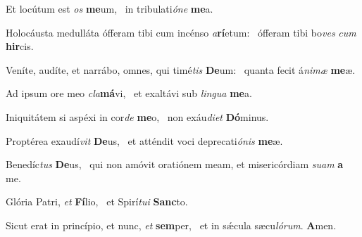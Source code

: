 \item Et locútum est \textit{os} \textbf{me}um,~\psstar{} in tribulati\textit{óne} \textbf{me}a.

\item Holocáusta medulláta ófferam tibi cum incénso \textit{a}\textbf{rí}etum:~\psstar{} ófferam tibi bo\textit{ves} \textit{cum} \textbf{hir}cis.

\item Veníte, audíte, et narrábo, omnes, qui timé\textit{tis} \textbf{De}um:~\psstar{} quanta fecit á\textit{nimæ} \textbf{me}æ.

\item Ad ipsum ore meo \textit{cla}\textbf{má}vi,~\psstar{} et exaltávi sub \textit{lingua} \textbf{me}a.

\item Iniquitátem si aspéxi in cor\textit{de} \textbf{me}o,~\psstar{} non exáu\textit{diet} \textbf{Dó}minus.

\item Proptérea exaudí\textit{vit} \textbf{De}us,~\psstar{} et atténdit voci deprecati\textit{ónis} \textbf{me}æ.

\item Benedíc\textit{tus} \textbf{De}us,~\psstar{} qui non amóvit oratiónem meam, et misericórdiam \textit{suam} \textbf{a} me.

\item Glória Patri, \textit{et} \textbf{Fí}lio,~\psstar{} et Spirí\textit{tui} \textbf{Sanc}to.

\item Sicut erat in princípio, et nunc, \textit{et} \textbf{sem}per,~\psstar{} et in sǽcula sæcu\textit{lórum}. \textbf{A}men.
